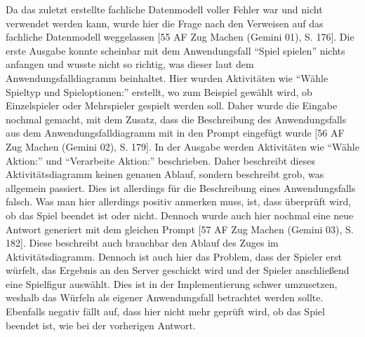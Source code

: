 Da das zuletzt erstellte fachliche Datenmodell voller Fehler war und nicht verwendet werden kann, wurde hier die Frage nach den Verweisen 
auf das fachliche Datenmodell weggelassen [55 AF Zug Machen (Gemini 01), S. 176]. Die erste Ausgabe konnte scheinbar mit dem Anwendungsfall ``Spiel spielen'' nichts anfangen und 
wusste nicht so richtig, was dieser laut dem Anwendungsfalldiagramm beinhaltet. Hier wurden Aktivitäten wie ``Wähle Spieltyp und Spieloptionen:'' 
erstellt, wo zum Beispiel gewählt wird, ob Einzelspieler oder Mehrspieler gespielt werden soll. Daher wurde die Eingabe nochmal gemacht, 
mit dem Zusatz, dass die Beschreibung des Anwendungsfalls aus dem Anwendungsfalldiagramm mit in den Prompt eingefügt wurde [56 AF Zug Machen (Gemini 02), S. 179]. In der Ausgabe 
werden Aktivitäten wie ``Wähle Aktion:'' und ``Verarbeite Aktion:'' beschrieben. Daher beschreibt dieses Aktivitätsdiagramm keinen genauen Ablauf, 
sondern beschreibt grob, was allgemein passiert. Dies ist allerdings für die Beschreibung eines Anwendungsfalls falsch. Was man hier allerdings 
positiv anmerken muss, ist, dass überprüft wird, ob das Spiel beendet ist oder nicht. Dennoch wurde auch hier nochmal eine neue Antwort 
generiert mit dem gleichen Prompt [57 AF Zug Machen (Gemini 03), S. 182]. Diese beschreibt auch brauchbar den Ablauf des Zuges im Aktivitätsdiagramm. Dennoch ist auch hier das 
Problem, dass der Spieler erst würfelt, das Ergebnis an den Server geschickt wird und der Spieler anschließend eine Spielfigur auswählt. 
Dies ist in der Implementierung schwer umzusetzen, weshalb das Würfeln als eigener Anwendungsfall betrachtet werden sollte. Ebenfalls 
negativ fällt auf, dass hier nicht mehr geprüft wird, ob das Spiel beendet ist, wie bei der vorherigen Antwort.

